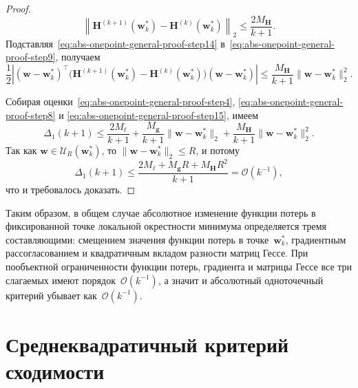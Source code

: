 \begin{proof}
\begin{equation}
        \label{eq:abs-onepoint-general-proof-step14}
        \left\|
            \mathbf H^{(k+1)}(\mathbf w_k^*)
            -
            \mathbf H^{(k)}(\mathbf w_k^*)
        \right\|_2
        \leqslant
        \frac{2M_{\mathbf H}}{k+1}.
    \end{equation}
    Подставляя~\eqref{eq:abs-onepoint-general-proof-step14}
    в~\eqref{eq:abs-onepoint-general-proof-step9}, получаем
    \begin{equation}
        \label{eq:abs-onepoint-general-proof-step15}
        \frac12
        \left|
            (\mathbf w-\mathbf w_k^*)^\top
            \Big(
                \mathbf H^{(k+1)}(\mathbf w_k^*)
                -
                \mathbf H^{(k)}(\mathbf w_k^*)
            \Big)
            (\mathbf w-\mathbf w_k^*)
        \right|
        \leqslant
        \frac{M_{\mathbf H}}{k+1}
        \|\mathbf w-\mathbf w_k^*\|_2^2.
    \end{equation}

    Собирая оценки~\eqref{eq:abs-onepoint-general-proof-step4},
    \eqref{eq:abs-onepoint-general-proof-step8} и
    \eqref{eq:abs-onepoint-general-proof-step15}, имеем
    \begin{equation}
        \label{eq:abs-onepoint-general-proof-step16}
        \Delta_1(k+1)
        \leqslant
        \frac{2M_\ell}{k+1}
        +
        \frac{M_{\mathbf g}}{k+1}\|\mathbf w-\mathbf w_k^*\|_2
        +
        \frac{M_{\mathbf H}}{k+1}\|\mathbf w-\mathbf w_k^*\|_2^2.
    \end{equation}
    Так как $\mathbf w \in \mathcal U_R(\mathbf w_k^*)$, то
    $\|\mathbf w-\mathbf w_k^*\|_2 \leqslant R$, и потому
    \begin{equation}
        \Delta_1(k+1)
        \leqslant
        \frac{2M_\ell + M_{\mathbf g}R + M_{\mathbf H}R^2}{k+1}
        = \mathcal{O}(k^{-1}),
    \end{equation}
    что и требовалось доказать.
\end{proof}

Таким образом, в общем случае абсолютное изменение функции потерь в фиксированной точке локальной окрестности минимума определяется тремя составляющими: смещением значения функции потерь в точке~$\mathbf w_k^*$, градиентным рассогласованием и квадратичным вкладом разности матриц Гессе. При пообъектной ограниченности функции потерь, градиента и матрицы Гессе все три слагаемых имеют порядок~$\mathcal O(k^{-1})$, а значит и абсолютный одноточечный критерий убывает как~$\mathcal O(k^{-1})$.

\section{Среднеквадратичный критерий сходимости}

